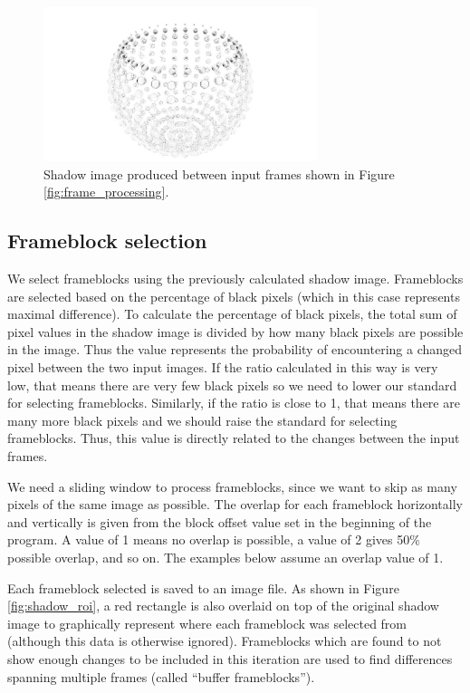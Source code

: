 \documentclass[conference]{IEEEtran}
\begin{document}
\begin{figure}[htbp]
\centerline{\includegraphics[width=8cm]{shadow_image.png}}
\caption{Shadow image produced between input frames shown in Figure
\ref{fig:frame_processing}.}
\label{fig:shadow_image}
\end{figure}

\subsection{Frameblock selection}
\label{subsec:frameblock_selection}
We select frameblocks using the previously calculated shadow image.
Frameblocks are selected based on the percentage of black pixels
(which in this case represents maximal difference).
To calculate the percentage of black pixels,
the total sum of pixel values in the shadow image is divided by how many black pixels are possible in the image.
Thus the value represents the probability of encountering a changed pixel between the two input images.
If the ratio calculated in this way is very low,
that means there are very few black pixels so we need to lower our standard for selecting frameblocks.
Similarly, if the ratio is close to 1,
that means there are many more black pixels and we should raise the standard for selecting frameblocks.
Thus, this value is directly related to the changes between the input frames.

We need a sliding window to process frameblocks,
since we want to skip as many pixels of the same image as possible.
The overlap for each frameblock horizontally and vertically is given from the
block offset value set in the beginning of the program.
A value of 1 means no overlap is possible,
a value of 2 gives 50\% possible overlap, and so on. The examples below assume
an overlap value of 1.

Each frameblock selected is saved to an image file.
As shown in Figure \ref{fig:shadow_roi}, a red rectangle is also overlaid on top of the original
shadow image to graphically represent where each frameblock was selected from
(although this data is otherwise ignored).
Frameblocks which are found to not show enough changes to be included in this iteration
are used to find differences spanning multiple frames (called ``buffer
frameblocks'').
\end{document}

